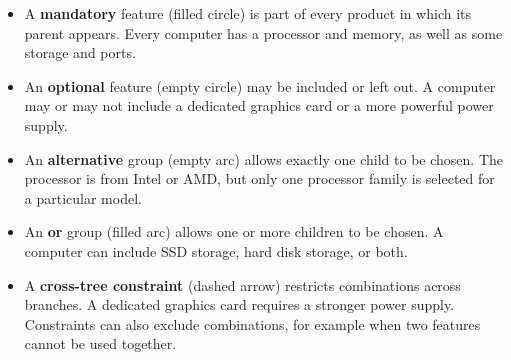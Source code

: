 \begin{itemize}
    \item A \textbf{mandatory} feature (filled circle) is part of every
    product in which its parent appears. Every computer has a processor and
    memory, as well as some storage and ports.

    \item An \textbf{optional} feature (empty circle) may be included or left
    out. A computer may or may not include a dedicated graphics card or a more
    powerful power supply.

    \item An \textbf{alternative} group (empty arc) allows exactly one child
    to be chosen. The processor is from Intel or AMD, but only one processor
    family is selected for a particular model.

    \item An \textbf{or} group (filled arc) allows one or more children to be
    chosen. A computer can include SSD storage, hard disk storage, or both.

    \item A \textbf{cross-tree constraint} (dashed arrow) restricts
    combinations across branches. A dedicated graphics card requires a stronger
    power supply. Constraints can also exclude combinations, for example when
    two features cannot be used together.
\end{itemize}

